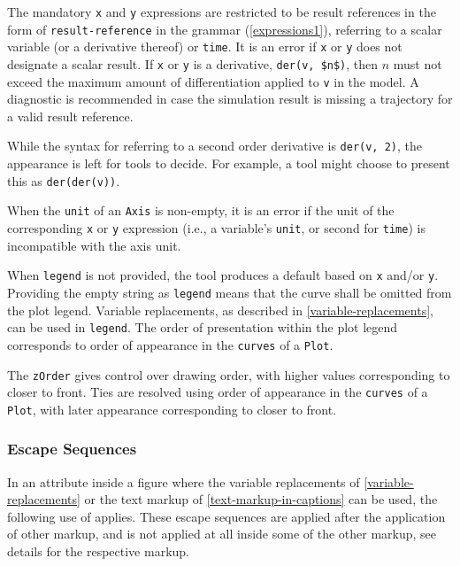The mandatory \lstinline!x! and \lstinline!y! expressions are restricted to be result references in the form of \lstinline[language=grammar]!result-reference! in the grammar (\cref{expressions1}), referring to a scalar variable (or a derivative thereof) or \lstinline!time!.
It is an error if \lstinline!x! or \lstinline!y! does not designate a scalar result.
If \lstinline!x! or \lstinline!y! is a derivative, \lstinline!der(v, $n$)!, then $n$ must not exceed the maximum amount of differentiation applied to \lstinline!v! in the model.
A diagnostic is recommended in case the simulation result is missing a trajectory for a valid result reference.

\begin{nonnormative}
While the syntax for referring to a second order derivative is \lstinline!der(v, 2)!, the appearance is left for tools to decide.
For example, a tool might choose to present this as \lstinline!der(der(v))!.
\end{nonnormative}

When the \lstinline!unit! of an \lstinline!Axis! is non-empty, it is an error if the unit of the corresponding \lstinline!x! or \lstinline!y! expression (i.e., a variable's \lstinline!unit!, or second for \lstinline!time!) is incompatible with the axis unit.

When \lstinline!legend! is not provided, the tool produces a default based on \lstinline!x! and/or \lstinline!y!.
Providing the empty string as \lstinline!legend! means that the curve shall be omitted from the plot legend.
Variable replacements, as described in \cref{variable-replacements}, can be used in \lstinline!legend!.
The order of presentation within the plot legend corresponds to order of appearance in the \lstinline!curves! of a \lstinline!Plot!.

The \lstinline!zOrder! gives control over drawing order, with higher values corresponding to closer to front.
Ties are resolved using order of appearance in the \lstinline!curves! of a \lstinline!Plot!, with later appearance corresponding to closer to front.

\subsubsection{Escape Sequences}\label{text-markup-escape-sequences}

In an attribute inside a figure where the variable replacements of \cref{variable-replacements} or the text markup of \cref{text-markup-in-captions} can be used, the following use of  applies.
These escape sequences are applied after the application of other markup, and is not applied at all inside some of the other markup, see details for the respective markup.

